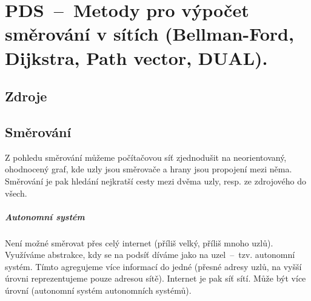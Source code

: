 

\graphicspath{{pds/teorie_smerovani/figures}}


\chapter{PDS~--~Metody pro výpočet směrování v sítích (Bellman-Ford, Dijkstra, Path vector, DUAL).}



\section{Zdroje}

\begin{compactitem}
    \item {}
    \item {}
\end{compactitem}


\section{Směrování}

Z pohledu směrování můžeme počítačovou síť zjednodušit na neorientovaný, ohodnocený graf, kde uzly jsou směrovače a hrany jsou propojení mezi něma. Směrování je pak hledání nejkratší cesty mezi dvěma uzly, resp. ze zdrojového do všech.

\paragraph*{Autonomní systém} Není možné směrovat přes celý internet (příliš velký, příliš mnoho uzlů). Využíváme abstrakce, kdy se na podsíť díváme jako na uzel~--~tzv. autonomní systém. Tímto agregujeme více informací do jedné (přesné adresy uzlů, na vyšší úrovni reprezentujeme pouze adresou sítě). Internet je pak síť sítí. Může být více úrovní (autonomní systém autonomních systémů).

